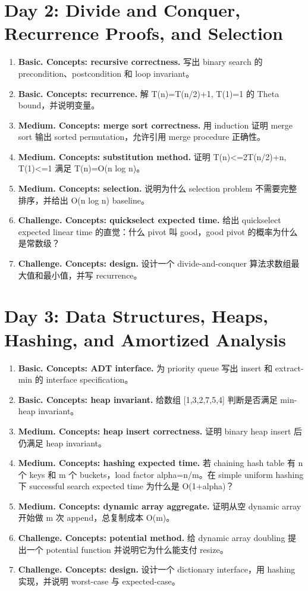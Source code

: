 \documentclass[11pt]{ctexart}
\begin{document}
\section{Day 2: Divide and Conquer, Recurrence Proofs, and Selection}
\begin{enumerate}
  \item \textbf{Basic. Concepts: recursive correctness.} 写出 binary search 的 precondition、postcondition 和 loop invariant。
  \item \textbf{Basic. Concepts: recurrence.} 解 T(n)=T(n/2)+1, T(1)=1 的 Theta bound，并说明变量。
  \item \textbf{Medium. Concepts: merge sort correctness.} 用 induction 证明 merge sort 输出 sorted permutation，允许引用 merge procedure 正确性。
  \item \textbf{Medium. Concepts: substitution method.} 证明 T(n)<=2T(n/2)+n, T(1)<=1 满足 T(n)=O(n log n)。
  \item \textbf{Medium. Concepts: selection.} 说明为什么 selection problem 不需要完整排序，并给出 O(n log n) baseline。
  \item \textbf{Challenge. Concepts: quickselect expected time.} 给出 quickselect expected linear time 的直觉：什么 pivot 叫 good，good pivot 的概率为什么是常数级？
  \item \textbf{Challenge. Concepts: design.} 设计一个 divide-and-conquer 算法求数组最大值和最小值，并写 recurrence。
\end{enumerate}

\section{Day 3: Data Structures, Heaps, Hashing, and Amortized Analysis}
\begin{enumerate}
  \item \textbf{Basic. Concepts: ADT interface.} 为 priority queue 写出 insert 和 extract-min 的 interface specification。
  \item \textbf{Basic. Concepts: heap invariant.} 给数组 [1,3,2,7,5,4] 判断是否满足 min-heap invariant。
  \item \textbf{Medium. Concepts: heap insert correctness.} 证明 binary heap insert 后仍满足 heap invariant。
  \item \textbf{Medium. Concepts: hashing expected time.} 若 chaining hash table 有 n 个 keys 和 m 个 buckets，load factor alpha=n/m。在 simple uniform hashing 下 successful search expected time 为什么是 O(1+alpha)？
  \item \textbf{Medium. Concepts: dynamic array aggregate.} 证明从空 dynamic array 开始做 m 次 append，总复制成本 O(m)。
  \item \textbf{Challenge. Concepts: potential method.} 给 dynamic array doubling 提出一个 potential function 并说明它为什么能支付 resize。
  \item \textbf{Challenge. Concepts: design.} 设计一个 dictionary interface，用 hashing 实现，并说明 worst-case 与 expected-case。
\end{enumerate}
\end{document}
